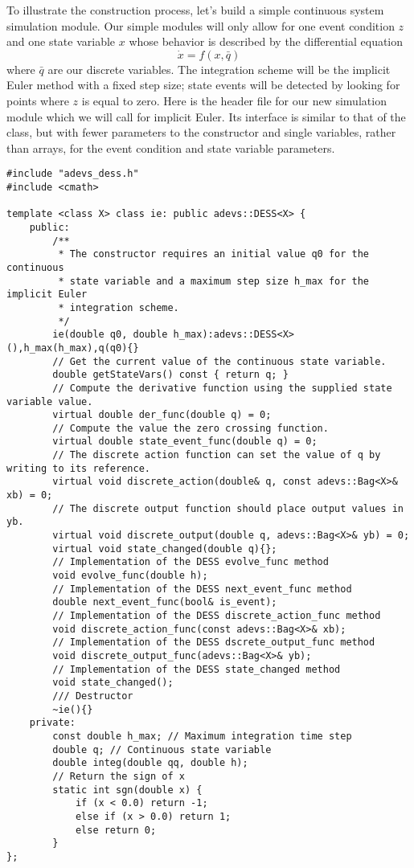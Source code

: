 To illustrate the construction process, let's build a simple continuous system simulation module. Our simple modules will only allow for one event condition $z$ and one state variable $x$ whose behavior is described by the differential equation
\begin{equation*}
\dot{x} = f(x,\bar{q})
\end{equation*}
where $\bar{q}$ are our discrete variables. The integration scheme will be the implicit Euler method with a fixed step size; state events will be detected by looking for points where $z$ is equal to zero. Here is the header file for our new simulation module which we will call  for implicit Euler. Its interface is similar to that of the  class, but with fewer parameters to the constructor and single variables, rather than arrays, for the event condition and state variable parameters.
\begin{verbatim}
#include "adevs_dess.h"
#include <cmath>

template <class X> class ie: public adevs::DESS<X> {
    public:
        /**
         * The constructor requires an initial value q0 for the continuous
         * state variable and a maximum step size h_max for the implicit Euler
         * integration scheme.
         */
        ie(double q0, double h_max):adevs::DESS<X>(),h_max(h_max),q(q0){}
        // Get the current value of the continuous state variable.
        double getStateVars() const { return q; }
        // Compute the derivative function using the supplied state variable value.
        virtual double der_func(double q) = 0;
        // Compute the value the zero crossing function.
        virtual double state_event_func(double q) = 0;
        // The discrete action function can set the value of q by writing to its reference.
        virtual void discrete_action(double& q, const adevs::Bag<X>& xb) = 0;
        // The discrete output function should place output values in yb.
        virtual void discrete_output(double q, adevs::Bag<X>& yb) = 0;
        virtual void state_changed(double q){};
        // Implementation of the DESS evolve_func method
        void evolve_func(double h);
        // Implementation of the DESS next_event_func method
        double next_event_func(bool& is_event);
        // Implementation of the DESS discrete_action_func method
        void discrete_action_func(const adevs::Bag<X>& xb);
        // Implementation of the DESS dscrete_output_func method
        void discrete_output_func(adevs::Bag<X>& yb);
        // Implementation of the DESS state_changed method
        void state_changed();
        /// Destructor
        ~ie(){}
    private:
        const double h_max; // Maximum integration time step
        double q; // Continuous state variable
        double integ(double qq, double h);
        // Return the sign of x
        static int sgn(double x) {
            if (x < 0.0) return -1;
            else if (x > 0.0) return 1;
            else return 0;
        }
};
\end{verbatim}

